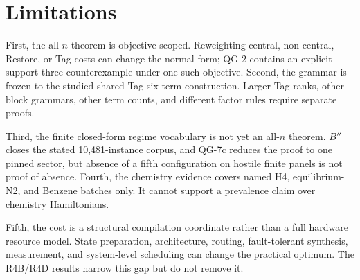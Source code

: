 \section{Limitations}

First, the all-$n$ theorem is objective-scoped. Reweighting central, non-central, Restore, or Tag costs can change the normal form; QG-2 contains an explicit support-three counterexample under one such objective. Second, the grammar is frozen to the studied shared-Tag six-term construction. Larger Tag ranks, other block grammars, other term counts, and different factor rules require separate proofs.

Third, the finite closed-form regime vocabulary is not yet an all-$n$ theorem. $B''$ closes the stated 10,481-instance corpus, and QG-7c reduces the proof to one pinned sector, but absence of a fifth configuration on hostile finite panels is not proof of absence. Fourth, the chemistry evidence covers named H4, equilibrium-N2, and Benzene batches only. It cannot support a prevalence claim over chemistry Hamiltonians.

Fifth, the cost is a structural compilation coordinate rather than a full hardware resource model. State preparation, architecture, routing, fault-tolerant synthesis, measurement, and system-level scheduling can change the practical optimum. The R4B/R4D results narrow this gap but do not remove it.